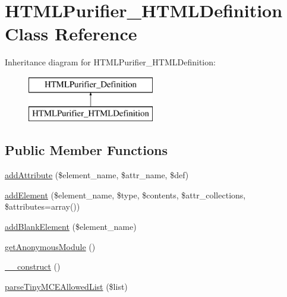 \hypertarget{classHTMLPurifier__HTMLDefinition}{\section{H\+T\+M\+L\+Purifier\+\_\+\+H\+T\+M\+L\+Definition Class Reference}
\label{classHTMLPurifier__HTMLDefinition}
}
Inheritance diagram for H\+T\+M\+L\+Purifier\+\_\+\+H\+T\+M\+L\+Definition\+:\begin{figure}[H]
\begin{center}
\leavevmode
\includegraphics[height=2.000000cm]{classHTMLPurifier__HTMLDefinition}
\end{center}
\end{figure}
\subsection*{Public Member Functions}
\begin{DoxyCompactItemize}
\item 
\hyperlink{classHTMLPurifier__HTMLDefinition_acb4dd65983a9b5e39af3a331a54d9d00}{add\+Attribute} (\$element\+\_\+name, \$attr\+\_\+name, \$def)
\item 
\hyperlink{classHTMLPurifier__HTMLDefinition_a296a4d8158f3557182247183e4b2edfe}{add\+Element} (\$element\+\_\+name, \$type, \$contents, \$attr\+\_\+collections, \$attributes=array())
\item 
\hyperlink{classHTMLPurifier__HTMLDefinition_aded195b5eb5eaae383ce7368a5fc581d}{add\+Blank\+Element} (\$element\+\_\+name)
\item 
\hyperlink{classHTMLPurifier__HTMLDefinition_afd47cf37e7b00258ee79589eb8300f69}{get\+Anonymous\+Module} ()
\item 
\hyperlink{classHTMLPurifier__HTMLDefinition_a286cbc793229cda4ad235ba4ea058920}{\+\_\+\+\_\+construct} ()
\item 
\hyperlink{classHTMLPurifier__HTMLDefinition_ac01c1b5601e259814b907c4d25680712}{parse\+Tiny\+M\+C\+E\+Allowed\+List} (\$list)
\end{DoxyCompactItemize}
